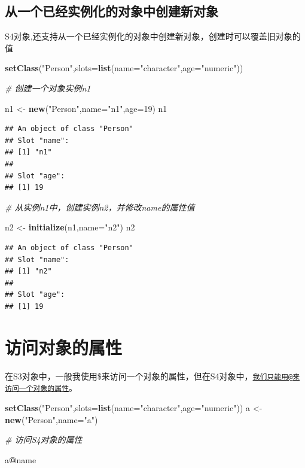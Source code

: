 \documentclass[]{book}
\newenvironment{Shaded}{\begin{snugshade}}{\end{snugshade}}
\newcommand{\KeywordTok}[1]{\textcolor[rgb]{0.13,0.29,0.53}{\textbf{#1}}}
\newcommand{\DataTypeTok}[1]{\textcolor[rgb]{0.13,0.29,0.53}{#1}}
\newcommand{\DecValTok}[1]{\textcolor[rgb]{0.00,0.00,0.81}{#1}}
\newcommand{\StringTok}[1]{\textcolor[rgb]{0.31,0.60,0.02}{#1}}
\newcommand{\CommentTok}[1]{\textcolor[rgb]{0.56,0.35,0.01}{\textit{#1}}}
\newcommand{\OperatorTok}[1]{\textcolor[rgb]{0.81,0.36,0.00}{\textbf{#1}}}
\newcommand{\NormalTok}[1]{#1}
\begin{document}
\subsection{从一个已经实例化的对象中创建新对象}

S4对象,还支持从一个已经实例化的对象中创建新对象，创建时可以覆盖旧对象的值

\begin{Shaded}
\begin{Highlighting}[]
\KeywordTok{setClass}\NormalTok{(}\StringTok{"Person"}\NormalTok{,}\DataTypeTok{slots=}\KeywordTok{list}\NormalTok{(}\DataTypeTok{name=}\StringTok{"character"}\NormalTok{,}\DataTypeTok{age=}\StringTok{"numeric"}\NormalTok{))}

\CommentTok{# 创建一个对象实例n1}

\NormalTok{n1 <-}\StringTok{ }\KeywordTok{new}\NormalTok{(}\StringTok{"Person"}\NormalTok{,}\DataTypeTok{name=}\StringTok{"n1"}\NormalTok{,}\DataTypeTok{age=}\DecValTok{19}\NormalTok{)}
\NormalTok{n1}
\end{Highlighting}
\end{Shaded}

\begin{verbatim}
## An object of class "Person"
## Slot "name":
## [1] "n1"
## 
## Slot "age":
## [1] 19
\end{verbatim}

\begin{Shaded}
\begin{Highlighting}[]
\CommentTok{# 从实例n1中，创建实例n2，并修改name的属性值}

\NormalTok{n2 <-}\StringTok{ }\KeywordTok{initialize}\NormalTok{(n1,}\DataTypeTok{name=}\StringTok{"n2"}\NormalTok{)}
\NormalTok{n2}
\end{Highlighting}
\end{Shaded}

\begin{verbatim}
## An object of class "Person"
## Slot "name":
## [1] "n2"
## 
## Slot "age":
## [1] 19
\end{verbatim}

\section{访问对象的属性}

在S3对象中，一般我使用\$来访问一个对象的属性，但在S4对象中，\href{mailto:我们只能用@来访问一个对象的属性}{\nolinkurl{我们只能用@来访问一个对象的属性}}。

\begin{Shaded}
\begin{Highlighting}[]
\KeywordTok{setClass}\NormalTok{(}\StringTok{"Person"}\NormalTok{,}\DataTypeTok{slots=}\KeywordTok{list}\NormalTok{(}\DataTypeTok{name=}\StringTok{"character"}\NormalTok{,}\DataTypeTok{age=}\StringTok{"numeric"}\NormalTok{))}
\NormalTok{a <-}\StringTok{ }\KeywordTok{new}\NormalTok{(}\StringTok{"Person"}\NormalTok{,}\DataTypeTok{name=}\StringTok{"a"}\NormalTok{)}

\CommentTok{# 访问S4对象的属性}

\NormalTok{a}\OperatorTok{@}\NormalTok{name}
\end{Highlighting}
\end{Shaded}
\end{document}
